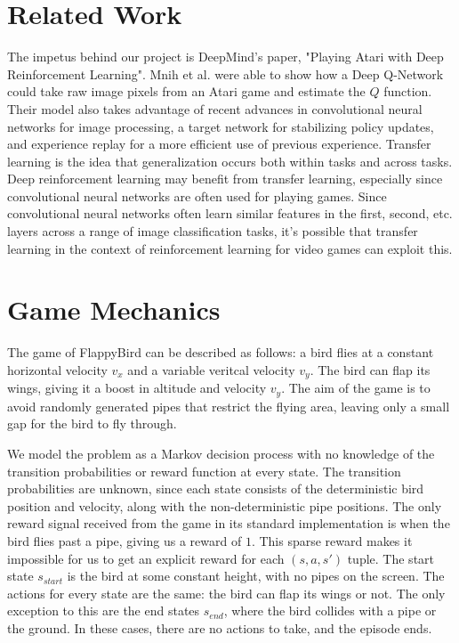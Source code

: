 \documentclass{article}
\begin{document}
\section{Related Work}
The impetus behind our project is DeepMind's paper, "Playing Atari with Deep Reinforcement Learning". Mnih et al. were able to show how a Deep Q-Network could take raw image pixels from an Atari game and estimate the $Q$ function. \cite{deepmind}
Their model also takes advantage of recent advances in convolutional neural networks for image processing, a target network for stabilizing policy updates, and experience replay for a more efficient use of previous experience.
Transfer learning is the idea that generalization occurs both within tasks and across tasks. \cite{transfer}
Deep reinforcement learning may benefit from transfer learning, especially since convolutional neural networks are often used for playing games.
Since convolutional neural networks often learn similar features in the first, second, etc. layers across a range of image classification tasks, it's possible that transfer learning in the context of reinforcement learning for video games can exploit this.

\section{Game Mechanics}

The game of FlappyBird can be described as follows: a bird flies at a constant horizontal velocity $v_x$ and a variable veritcal velocity $v_y$. 
The bird can flap its wings, giving it a boost in altitude and velocity $v_y$.
The aim of the game is to avoid randomly generated pipes that restrict the flying area, leaving only a small gap for the bird to fly through. 

We model the problem as a Markov decision process with no knowledge of the transition probabilities or reward function at every state.
The transition probabilities are unknown, since each state consists of the deterministic bird position and velocity, along with the non-deterministic pipe positions.
The only reward signal received from the game in its standard implementation is when the bird flies past a pipe, giving us a reward of $1$. 
This sparse reward makes it impossible for us to get an explicit reward for each $(s, a, s')$ tuple.
The start state $s_{start}$ is the bird at some constant height, with no pipes on the screen.
The actions for every state are the same: the bird can flap its wings or not.
The only exception to this are the end states $s_{end}$, where the bird collides with a pipe or the ground.
In these cases, there are no actions to take, and the episode ends.
\end{document}
